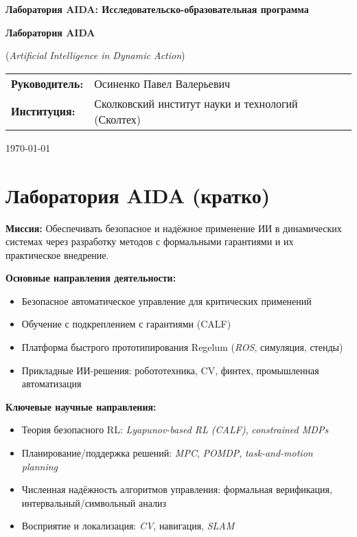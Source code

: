 \documentclass[12pt,a4paper]{article}
\begin{document}
\begin{titlepage}
    \centering
    \vspace*{1cm}
    
    {\Huge\bfseries Лаборатория AIDA: Исследовательско-образовательная программа\par}
    
    \vspace{1.5cm}
    
    {\Large\bfseries Лаборатория AIDA\par}
    {\large (\textit{Artificial Intelligence in Dynamic Action})\par}
    
    \vspace{1.5cm}
    
    \begin{tabular}{ll}
        \textbf{Руководитель:} & Осиненко Павел Валерьевич \\
        \textbf{Институция:} & Сколковский институт науки и технологий (Сколтех)
    \end{tabular}
    
    \vfill
    
    {\large \today\par}
\end{titlepage}

\section{Лаборатория AIDA (кратко)}

\textbf{Миссия:} Обеспечивать безопасное и надёжное применение ИИ в динамических системах через разработку методов с формальными гарантиями и их практическое внедрение.

\textbf{Основные направления деятельности:}
\begin{itemize}
    \item Безопасное автоматическое управление для критических применений
    \item Обучение с подкреплением с гарантиями (CALF)
    \item Платформа быстрого прототипирования Regelum (\textit{ROS}, симуляция, стенды)
    \item Прикладные ИИ-решения: робототехника, CV, финтех, промышленная автоматизация
\end{itemize}

\textbf{Ключевые научные направления:}
\begin{itemize}
    \item Теория безопасного RL: \textit{Lyapunov-based RL (CALF)}, \textit{constrained MDPs}
    \item Планирование/поддержка решений: \textit{MPC}, \textit{POMDP}, \textit{task-and-motion planning}
    \item Численная надёжность алгоритмов управления: формальная верификация, интервальный/символьный анализ
    \item Восприятие и локализация: \textit{CV}, навигация, \textit{SLAM}
\end{itemize}
\end{document}
